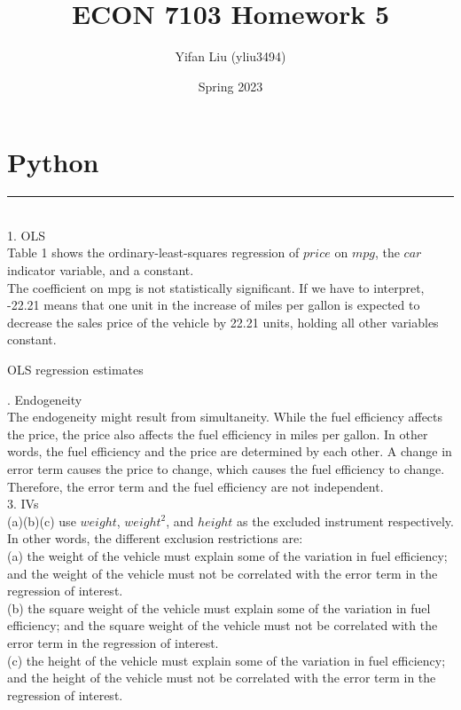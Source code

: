 \documentclass{article}
\title{ECON 7103 Homework 5}
\author{Yifan Liu (yliu3494)}
\date{Spring 2023}
\begin{document}
  
\maketitle



\noindent
\section{Python}
\noindent\rule{17cm}{0.4pt}
\smallskip
\\
1. OLS
\smallskip
\\Table 1 shows the ordinary-least-squares regression of $price$ on $mpg$, the $car$ indicator variable, and a constant. 
\\ The coefficient on mpg is not statistically significant. If we have to interpret, -22.21 means that one unit in the increase of miles per gallon is expected to decrease the sales price of the vehicle by 22.21 units, holding all other variables constant.
\begin{table}[H]
    \centering
    
    \caption{OLS regression estimates}
    \label{tab:Q1}
\end{table}
\bigskip
{}. Endogeneity
\smallskip
\\The endogeneity might result from simultaneity. While the fuel efficiency affects the price, the price also affects the fuel efficiency in miles per gallon. In other words, the fuel efficiency and the price are determined by each other. A change in error term causes the price to change, which causes the fuel efficiency to change. Therefore, the error term and the fuel efficiency are not independent.
\bigskip
\\
3. IVs
\smallskip
\\(a)(b)(c) use $weight$, $weight^2$, and $height$ as the excluded instrument respectively. In other words, the different exclusion restrictions are: 
\\ (a) the weight of the vehicle must explain some of the variation in fuel efficiency; and the weight of the vehicle must not be correlated with the error term in the regression of interest. 
\\ (b) the square weight of the vehicle must explain some of the variation in fuel efficiency; and the square weight of the vehicle must not be correlated with the error term in the regression of interest. 
\\ (c) the height of the vehicle must explain some of the variation in fuel efficiency; and the height of the vehicle must not be correlated with the error term in the regression of interest. 
\end{document}
